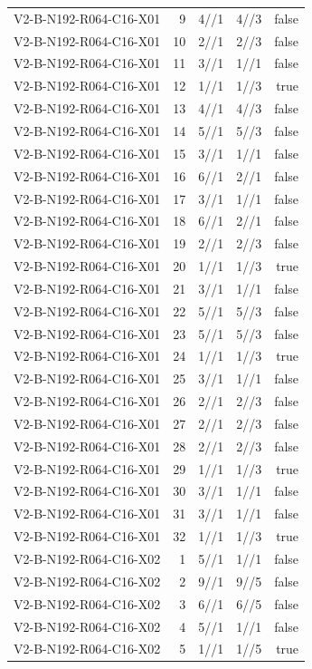 {\begin{longtable}{lrrrr}
V2-B-N192-R064-C16-X01 & 9 & 4//1 & 4//3 & false \\
V2-B-N192-R064-C16-X01 & 10 & 2//1 & 2//3 & false \\
V2-B-N192-R064-C16-X01 & 11 & 3//1 & 1//1 & false \\
V2-B-N192-R064-C16-X01 & 12 & 1//1 & 1//3 & true \\
V2-B-N192-R064-C16-X01 & 13 & 4//1 & 4//3 & false \\
V2-B-N192-R064-C16-X01 & 14 & 5//1 & 5//3 & false \\
V2-B-N192-R064-C16-X01 & 15 & 3//1 & 1//1 & false \\
V2-B-N192-R064-C16-X01 & 16 & 6//1 & 2//1 & false \\
V2-B-N192-R064-C16-X01 & 17 & 3//1 & 1//1 & false \\
V2-B-N192-R064-C16-X01 & 18 & 6//1 & 2//1 & false \\
V2-B-N192-R064-C16-X01 & 19 & 2//1 & 2//3 & false \\
V2-B-N192-R064-C16-X01 & 20 & 1//1 & 1//3 & true \\
V2-B-N192-R064-C16-X01 & 21 & 3//1 & 1//1 & false \\
V2-B-N192-R064-C16-X01 & 22 & 5//1 & 5//3 & false \\
V2-B-N192-R064-C16-X01 & 23 & 5//1 & 5//3 & false \\
V2-B-N192-R064-C16-X01 & 24 & 1//1 & 1//3 & true \\
V2-B-N192-R064-C16-X01 & 25 & 3//1 & 1//1 & false \\
V2-B-N192-R064-C16-X01 & 26 & 2//1 & 2//3 & false \\
V2-B-N192-R064-C16-X01 & 27 & 2//1 & 2//3 & false \\
V2-B-N192-R064-C16-X01 & 28 & 2//1 & 2//3 & false \\
V2-B-N192-R064-C16-X01 & 29 & 1//1 & 1//3 & true \\
V2-B-N192-R064-C16-X01 & 30 & 3//1 & 1//1 & false \\
V2-B-N192-R064-C16-X01 & 31 & 3//1 & 1//1 & false \\
V2-B-N192-R064-C16-X01 & 32 & 1//1 & 1//3 & true \\
V2-B-N192-R064-C16-X02 & 1 & 5//1 & 1//1 & false \\
V2-B-N192-R064-C16-X02 & 2 & 9//1 & 9//5 & false \\
V2-B-N192-R064-C16-X02 & 3 & 6//1 & 6//5 & false \\
V2-B-N192-R064-C16-X02 & 4 & 5//1 & 1//1 & false \\
V2-B-N192-R064-C16-X02 & 5 & 1//1 & 1//5 & true \\

\end{longtable}}
